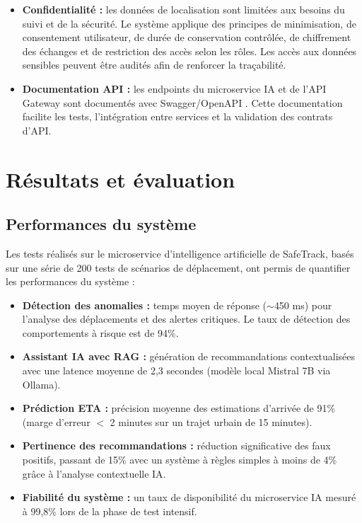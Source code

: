 \begin{itemize}
    \item \textbf{Confidentialité :} les données de localisation sont limitées aux besoins du suivi et de la sécurité. Le système applique des principes de minimisation, de consentement utilisateur, de durée de conservation contrôlée, de chiffrement des échanges et de restriction des accès selon les rôles. Les accès aux données sensibles peuvent être audités afin de renforcer la traçabilité.
    
    \item \textbf{Documentation API :} les endpoints du microservice IA et de l’API Gateway sont documentés avec Swagger/OpenAPI \cite{swagger,openapi}. Cette documentation facilite les tests, l’intégration entre services et la validation des contrats d’API.
\end{itemize}

\section{Résultats et évaluation}

\subsection{Performances du système}

Les tests réalisés sur le microservice d’intelligence artificielle de SafeTrack, basés sur une série de 200 tests de scénarios de déplacement, ont permis de quantifier les performances du système :

\begin{itemize}
    \item \textbf{Détection des anomalies :} temps moyen de réponse ($\sim$450 ms) pour l’analyse des déplacements et des alertes critiques. Le taux de détection des comportements à risque est de 94\%.
    
    \item \textbf{Assistant IA avec RAG :} génération de recommandations contextualisées avec une latence moyenne de 2,3 secondes (modèle local Mistral 7B via Ollama).
    
    \item \textbf{Prédiction ETA :} précision moyenne des estimations d’arrivée de 91\% (marge d'erreur $<$ 2 minutes sur un trajet urbain de 15 minutes).
    
    \item \textbf{Pertinence des recommandations :} réduction significative des faux positifs, passant de 15\% avec un système à règles simples à moins de 4\% grâce à l’analyse contextuelle IA.
    
    \item \textbf{Fiabilité du système :} un taux de disponibilité du microservice IA mesuré à 99,8\% lors de la phase de test intensif.
\end{itemize}

